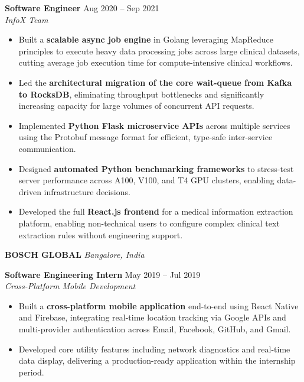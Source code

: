 \documentclass[11pt,a4paper]{article}
\begin{document}
\vspace{3pt}
\noindent\textbf{Software Engineer} \hfill Aug 2020 -- Sep 2021 \\
\textit{InfoX Team}\vspace{3pt}
\begin{itemize}[leftmargin=*, noitemsep, topsep=1pt, label={\small\textbullet}, itemsep=0pt]
\RaggedRight
    \item Built a \textbf{scalable async job engine} in Golang leveraging MapReduce principles to execute heavy data processing jobs across large clinical datasets, cutting average job execution time for compute-intensive clinical workflows.
    \item Led the \textbf{architectural migration of the core wait-queue from Kafka to RocksDB}, eliminating throughput bottlenecks and significantly increasing capacity for large volumes of concurrent API requests.
    \item Implemented \textbf{Python Flask microservice APIs} across multiple services using the Protobuf message format for efficient, type-safe inter-service communication.
    \item Designed \textbf{automated Python benchmarking frameworks} to stress-test server performance across A100, V100, and T4 GPU clusters, enabling data-driven infrastructure decisions.
    \item Developed the full \textbf{React.js frontend} for a medical information extraction platform, enabling non-technical users to configure complex clinical text extraction rules without engineering support.
\end{itemize}

\vspace{4pt}

{\Large\bfseries BOSCH GLOBAL} \hfill \textit{Bangalore, India}

\vspace{3pt}
\noindent\textbf{Software Engineering Intern} \hfill May 2019 -- Jul 2019 \\
\textit{Cross-Platform Mobile Development}\vspace{3pt}
\begin{itemize}[leftmargin=*, noitemsep, topsep=1pt, label={\small\textbullet}, itemsep=0pt]
\RaggedRight
    \item Built a \textbf{cross-platform mobile application} end-to-end using React Native and Firebase, integrating real-time location tracking via Google APIs and multi-provider authentication across Email, Facebook, GitHub, and Gmail.
    \item Developed core utility features including network diagnostics and real-time data display, delivering a production-ready application within the internship period.
\end{itemize}
\end{document}

